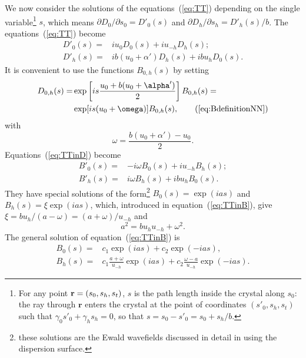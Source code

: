\documentclass{iucr}
\begin{document}
We now consider the solutions of the equations~(\ref{eq:TT}) depending on the single variable\footnote{
For any point $\textbf r=(s_0,s_h,s_t)$, $s$ is the path length inside the crystal along $s_0$: the ray through $\textbf{r}$ enters the crystal at the point of coordinates $(s'_0,s_h,s_t)$ such that $\gamma_0 s'_0+\gamma_h s_h = 0$, so that 
$s = s_0 - s'_0 = s_0 + s_h /b$.
}
$s$, which means 
$\partial D_{0} / \partial  s_{0}=D'_{0}(s)$ and $\partial D_{h} / \partial s_{h}=D'_{h}(s)/b$.
The equations~(\ref{eq:TT}) become
\begin{subequations}
\label{eq:TTinD}
\begin{align}
D'_0(s) =& i u_0 D_0(s) + i u_{-h} D_h(s); \\
D'_h(s) =& i b (u_0 + \alpha') D_h(s) + i b u_{h} D_0(s).
\end{align}
\end{subequations}
It is convenient to use the functions $B_{0,h}(s)$ by setting
\begin{subequations}\label{eq:BdefinitionNN}
\begin{align}
D_{0,h}(s) =& 
\exp \left[ i s \frac{u_0 + b (u_0+\alpha')}{2} \right] B_{0,h}(s) = \nonumber \\ 
&\exp[i s (u_0+\omega)] B_{0,h}(s), \tag{\ref{eq:BdefinitionNN}}
\end{align}
\end{subequations}
with
\begin{equation}\label{eq:omega}
    \omega=\frac{ b (u_0 + \alpha') - u_0}{2}.
\end{equation}
Equations~(\ref{eq:TTinD}) become 
\begin{subequations}
\label{eq:TTinB}
\begin{align}
B'_0(s) =& -i \omega B_0(s) + i u_{-h} B_h(s); \\
B'_h(s) =& i \omega B_h(s) + i b u_{h} B_0(s).
\end{align}
\end{subequations}
They have special solutions of the form\footnote{these solutions are the Ewald wavefields discussed in detail in \cite{authierbook} using the dispersion surface.} $B_0(s)=\exp(i a s)$ and $B_h(s)=\xi \exp(i a s)$, which, introduced in equation~(\ref{eq:TTinB}), give $\xi=bu_h/(a-\omega)=(a+\omega)/u_{-h}$ and 
\begin{equation}\label{eq:a}
    a^2=b u_h u_{-h}+\omega^2.
\end{equation}
The general solution of equation~(\ref{eq:TTinB}) is
\begin{subequations}
\label{eq:BSolutions}
\begin{align}
B_0(s) = &c_1 \exp(i a s) + c_2 \exp(-i a s), \\
B_h(s) = &c_1 \frac{a+\omega}{u_{-h}} \exp(i a s) + c_2 
\frac{\omega-a}{u_{-h}} \exp(-i a s).
\end{align}
\end{subequations}
\end{document}

